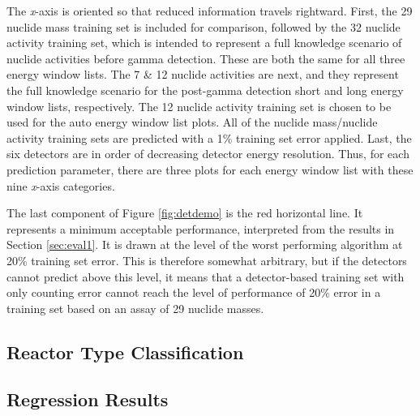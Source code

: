 The \textit{x}-axis is oriented so that reduced information travels rightward.
First, the 29 nuclide mass training set is included for comparison, followed by
the 32 nuclide activity training set, which is intended to represent a full
knowledge scenario of nuclide activities before gamma detection. These are both
the same for all three energy window lists.  The 7 \& 12 nuclide activities are
next, and they represent the full knowledge scenario for the post-gamma
detection short and long energy window lists, respectively.  The 12 nuclide
activity training set is chosen to be used for the auto energy window list
plots.  All of the nuclide mass/nuclide activity training sets are predicted
with a 1\% training set error applied.  Last, the six detectors are in order of
decreasing detector energy resolution. Thus, for each prediction parameter,
there are three plots for each energy window list with these nine
\textit{x}-axis categories. 

The last component of Figure \ref{fig:detdemo} is the red horizontal line.  It
represents a minimum acceptable performance, interpreted from the results in
Section \ref{sec:eval1}. It is drawn at the level of the worst performing
algorithm at 20\% training set error.  This is therefore somewhat arbitrary,
but if the detectors cannot predict above this level, it means that a
detector-based training set with only counting error cannot reach the level of
performance of 20\% error in a training set based on an assay of 29 nuclide
masses.

\subsection{Reactor Type Classification}

\label{sec:exp2_rxtr}

\subsection{Regression Results}

\label{sec:exp2_reg}

